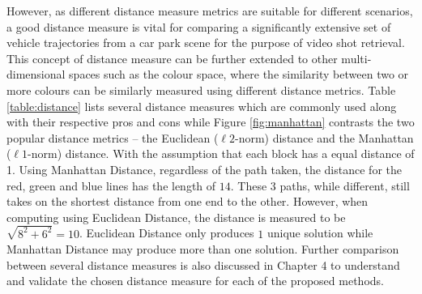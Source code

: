 However, as different distance measure metrics are suitable for different
scenarios, a good distance measure is vital for comparing a significantly
extensive set of vehicle trajectories from a car park scene for the purpose of video shot retrieval. This concept of distance measure can be further extended to other
multi-dimensional spaces such as the colour space, where the similarity between
two or more colours can be similarly measured using different distance metrics. 
Table \ref{table:distance} lists several
distance measures which are commonly used along with their respective pros and cons while Figure \ref{fig:manhattan} contrasts the two popular distance metrics -- the Euclidean ($\ell 2$-norm) distance and the Manhattan ($\ell 1$-norm) distance. 
With the assumption that each block has a equal distance of 1. Using Manhattan Distance, regardless of the path taken, the distance for the red, green and  blue lines has the length of $14$. These 3 paths, while different, still takes on the shortest distance from one end to the other. However, when computing using Euclidean Distance, the distance is measured to be $\sqrt{8^2+6^2} = 10$. Euclidean Distance only produces $1$ unique solution while Manhattan Distance may produce more than one solution.
Further comparison between several distance measures is
also discussed in Chapter 4 to understand and validate the chosen distance
measure for each of the proposed methods.


